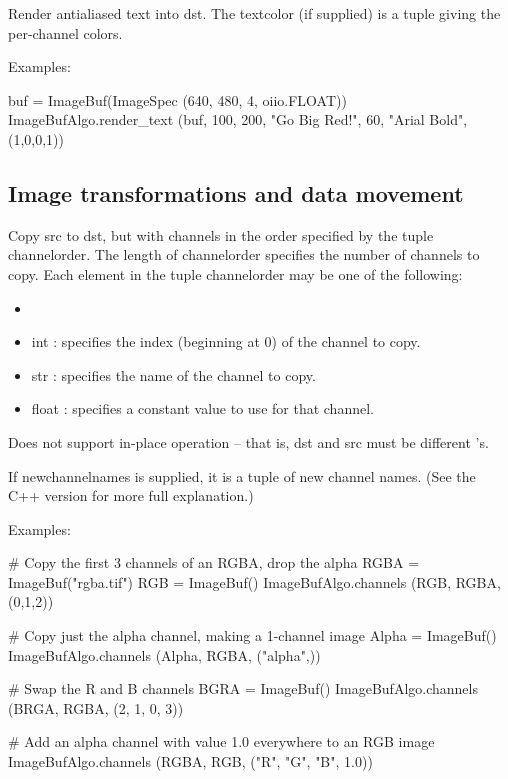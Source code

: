 Render antialiased text into {\cf dst}.  The {\cf textcolor} (if supplied)
is a tuple giving the per-channel colors.

\smallskip
\noindent Examples:
\begin{code}
    buf = ImageBuf(ImageSpec (640, 480, 4, oiio.FLOAT))
    ImageBufAlgo.render_text (buf, 100, 200, "Go Big Red!",
                               60, "Arial Bold", (1,0,0,1))
\end{code}
\apiend



\subsection{Image transformations and data movement}
\label{sec:iba:py:transforms}

 

Copy {\cf src} to {\cf dst}, but with channels in
the order specified by the tuple {\cf channelorder}. 
The length of {\cf channelorder} specifies the number of channels to copy.
Each element in the tuple {\cf channelorder} may be one of the following:
\begin{itemize}
\item {}
\item {\cf int} : specifies the index (beginning at 0) of the channel
    to copy.
\item {\cf str} : specifies the name of the channel to copy.
\item {\cf float} : specifies a constant value to use for that channel.
\end{itemize}

Does not support in-place operation -- that is, {\cf dst} and {\cf src} must
be different \ImageBuf's.

If {\cf newchannelnames} is supplied, it is a tuple of new channel
names. (See the C++ version for more full explanation.)

\smallskip
\noindent Examples:
\begin{code}
    # Copy the first 3 channels of an RGBA, drop the alpha
    RGBA = ImageBuf("rgba.tif")
    RGB = ImageBuf()
    ImageBufAlgo.channels (RGB, RGBA, (0,1,2))

    # Copy just the alpha channel, making a 1-channel image
    Alpha = ImageBuf()
    ImageBufAlgo.channels (Alpha, RGBA, ("alpha",))

    # Swap the R and B channels
    BGRA = ImageBuf()
    ImageBufAlgo.channels (BRGA, RGBA, (2, 1, 0, 3))

    # Add an alpha channel with value 1.0 everywhere to an RGB image
    ImageBufAlgo.channels (RGBA, RGB, ("R", "G", "B", 1.0))
\end{code}
\apiend


